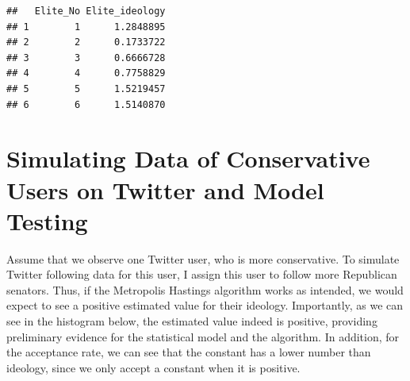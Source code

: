 \documentclass[]{book}
\newenvironment{Shaded}{\begin{snugshade}}{\end{snugshade}}
\newcommand{\KeywordTok}[1]{\textcolor[rgb]{0.13,0.29,0.53}{\textbf{#1}}}
\newcommand{\DecValTok}[1]{\textcolor[rgb]{0.00,0.00,0.81}{#1}}
\newcommand{\StringTok}[1]{\textcolor[rgb]{0.31,0.60,0.02}{#1}}
\newcommand{\CommentTok}[1]{\textcolor[rgb]{0.56,0.35,0.01}{\textit{#1}}}
\newcommand{\OperatorTok}[1]{\textcolor[rgb]{0.81,0.36,0.00}{\textbf{#1}}}
\newcommand{\NormalTok}[1]{#1}
\begin{document}
\begin{verbatim}
##   Elite_No Elite_ideology
## 1        1      1.2848895
## 2        2      0.1733722
## 3        3      0.6666728
## 4        4      0.7758829
## 5        5      1.5219457
## 6        6      1.5140870
\end{verbatim}

\section{Simulating Data of Conservative Users on Twitter and Model
Testing}\label{simulating-data-of-conservative-users-on-twitter-and-model-testing}

Assume that we observe one Twitter user, who is more conservative. To
simulate Twitter following data for this user, I assign this user to
follow more Republican senators. Thus, if the Metropolis Hastings
algorithm works as intended, we would expect to see a positive estimated
value for their ideology. Importantly, as we can see in the histogram
below, the estimated value indeed is positive, providing preliminary
evidence for the statistical model and the algorithm. In addition, for
the acceptance rate, we can see that the constant has a lower number
than ideology, since we only accept a constant when it is positive.

\begin{Shaded}
\end{Shaded}
\end{document}
